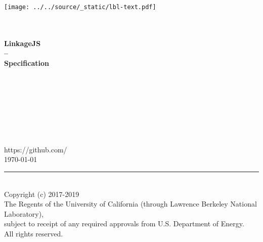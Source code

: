 \begin{titlepage}
\begin{minipage}{\headwidth}
\begin{flushright}
\texttt{[image: ../../source/\_static/lbl-text.pdf]}
\end{flushright}
\begin{flushright}
\vspace{-1cm}
\large{~}
\\[5mm]
\hrulefill
\\[5mm]
 \Large\sffamily\bfseries{LinkageJS}\\
 \Large\sffamily\bfseries{--}\\[3mm]
 \Large\sffamily\bfseries{Specification}\\
 \Large\sffamily\bfseries{~}
\\
\hrulefill
~\\[30mm]
\end{flushright}
\begin{center}
\large{~}\\
\large{~}\\
\large{~}\\
\large{~}\\
\large{~}\\
\large{https://github.com/}
~\\[30mm]
\large{\today}
\\[30mm]
\end{center}
\hrule
~\\[2mm]
Copyright (c) 2017-2019\\
The Regents of the University of California
(through Lawrence Berkeley National Laboratory),\\
subject to receipt of any required approvals from U.S. Department of Energy.\\
All rights reserved.
\end{minipage}
\end{titlepage}
